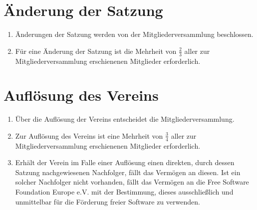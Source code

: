 \documentclass[german,a4paper]{article} %
\newenvironment{enumpar}{%
  \renewcommand{\labelenumi}{\theenumi}%
  \renewcommand{\theenumi}{(\arabic{enumi})}%
  \renewcommand{\labelenumii}{\theenumii}%
  \renewcommand{\theenumii}{(\alph{enumii})}%
  \begin{enumerate}}
{\end{enumerate}}
\begin{document}
\section{Änderung der Satzung}
\label{Satzungsänderung}
\begin{enumpar}
\item Änderungen der Satzung werden von der Mitgliederversammlung beschlossen.
\item Für eine Änderung der Satzung ist die Mehrheit von $\frac{2}{3}$ aller zur Mitgliederversammlung erschienenen Mitglieder erforderlich.
\end{enumpar}

\section{Auflösung des Vereins}
\label{Auflösung}
\begin{enumpar}
\item Über die Auflösung der Vereins entscheidet die Mitgliederversammlung.
\item Zur Auflösung des Vereins ist eine Mehrheit von $\frac{3}{4}$ aller zur Mitgliederversammlung erschienenen Mitglieder erforderlich.
\item Erhält der Verein im Falle einer Auflösung einen direkten, durch dessen Satzung nachgewiesenen Nachfolger, fällt das Vermögen an diesen. Ist ein solcher Nachfolger nicht vorhanden, fällt das Vermögen an die Free Software Foundation Europe e.V. mit der Bestimmung, dieses ausschließlich und unmittelbar für die Förderung freier Software zu verwenden.
\end{enumpar}
\end{document}
